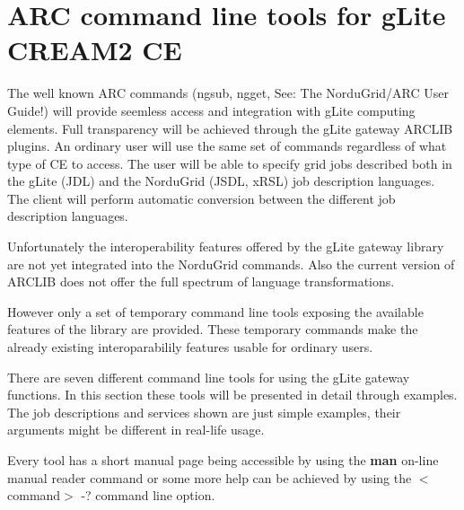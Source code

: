 \documentclass{article}
\begin{document}
\section{ARC command line tools for gLite CREAM2 CE}
\label{Users guide}
The well known ARC commands (ngsub, ngget, See: The NorduGrid/ARC User Guide\cite{userguide}!) will provide seemless access and integration with gLite computing elements. Full transparency will be achieved through the gLite gateway ARCLIB plugins. An ordinary user will use the same set of commands regardless of what type of CE to access. The user will be able to specify grid jobs described both in the gLite (JDL) and the NorduGrid (JSDL, xRSL) job description languages. The client will perform automatic conversion between the different job description languages.\par
Unfortunately the interoperability features offered by the gLite gateway library are not yet integrated into the NorduGrid commands. Also the current version of ARCLIB does not offer the full spectrum of language transformations.\par
However only a set of temporary command line tools exposing the available features of the library are provided. These temporary commands make the already existing interoparabilily features usable for ordinary users.\par
There are seven different command line tools for using the gLite gateway functions. In this section these tools will be presented in detail through examples. The job descriptions and services shown are just simple examples, their arguments might be different in real-life usage.\par
Every tool has a short manual page being accessible by using the \textbf{man} on-line manual reader command or some more help can be achieved by using the $<$command$>$ -? command line option.\par
\end{document}
